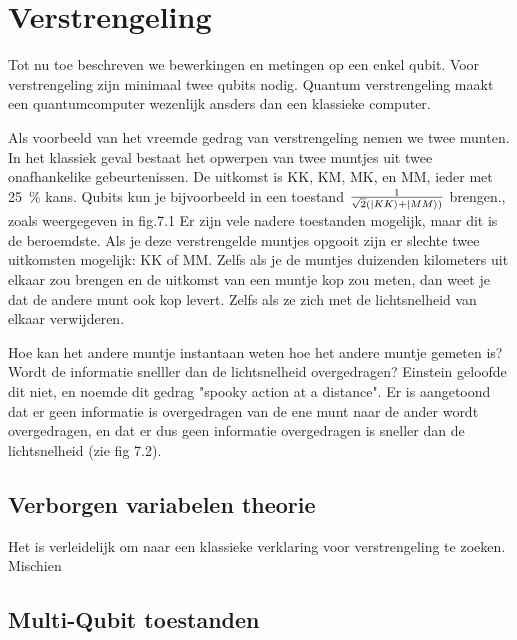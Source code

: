 \documentclass[../../main.tex]{subfiles}
\begin{document}
\onlyinsubfile{\setcounter{chapter}{8}}
\notinsubfile{}
\chapter{Verstrengeling}
\onlyinsubfile{
\marginpar{\vspace{0cm}
\textcolor{red}{ hoofdstuk is los gecompileerd, hstk nummer is 1}}
}
\notinsubfile{
\marginpar{\vspace{0cm}
\textcolor{red}{main.tex gecompileerd, nummering zou moeten kloppen}}
}
Tot nu toe beschreven we bewerkingen en metingen op een enkel qubit. Voor verstrengeling zijn minimaal twee qubits nodig. Quantum verstrengeling maakt een quantumcomputer wezenlijk ansders dan een klassieke computer.

Als voorbeeld van het vreemde gedrag van verstrengeling nemen we twee munten. In het klassiek geval bestaat het opwerpen van twee muntjes uit twee onafhankelike gebeurtenissen. De uitkomst is KK, KM, MK, en MM, ieder met \SI{25}{\percent} kans. Qubits kun je bijvoorbeeld in een toestand $\tfrac{1}{\sqrt{2}(\ket{KK}+\ket{MM})}$ brengen., zoals weergegeven in fig.7.1 Er zijn vele nadere toestanden mogelijk, maar dit is de beroemdste. Als je deze verstrengelde muntjes opgooit zijn er slechte twee uitkomsten mogelijk: KK of MM. Zelfs als je de muntjes duizenden kilometers uit elkaar zou brengen en de uitkomst van een muntje kop zou meten, dan weet je dat de andere munt ook kop levert. Zelfs als ze zich met de lichtsnelheid van elkaar verwijderen. 

Hoe kan het andere muntje instantaan weten hoe het andere muntje gemeten is? Wordt de informatie snelller dan de lichtsnelheid overgedragen? Einstein geloofde dit niet, en noemde dit gedrag "spooky action at a distance". Er is aangetoond dat er geen informatie is overgedragen van de ene munt naar de ander wordt overgedragen, en dat er dus geen informatie overgedragen is sneller dan de lichtsnelheid (zie fig 7.2). 

\section{Verborgen variabelen theorie}
Het is verleidelijk om naar een klassieke verklaring voor verstrengeling te zoeken. Mischien


\section{Multi-Qubit toestanden}
\end{document}
